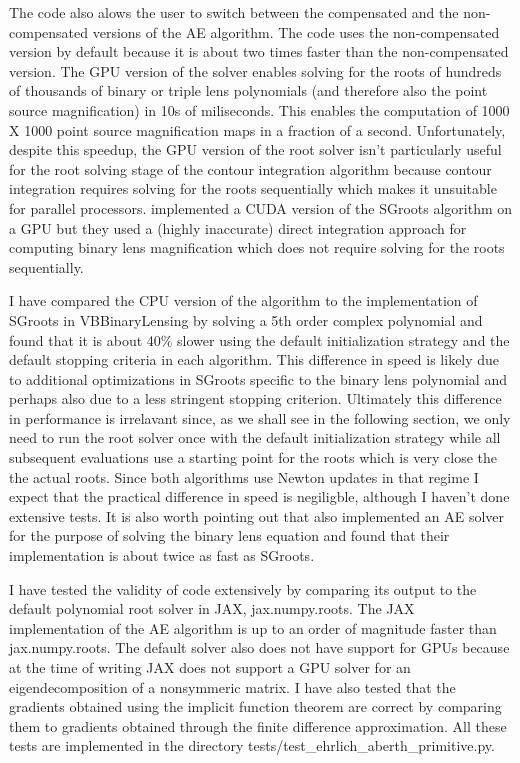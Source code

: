 \documentclass[12pt,dvipsnames]{report}
\newcommand{\ssf}[1]{\textsf{#1}}
\begin{document}
The code also alows the user to switch between the compensated  and the non-compensated 
versions of the AE algorithm. The code uses the non-compensated version by default because 
it is about two times faster than the non-compensated version. The GPU version of the 
solver enables solving for the roots of hundreds of thousands of binary or triple lens 
polynomials (and therefore also the point source magnification) in 10s of miliseconds.  
This enables the computation of 1000 X 1000 point source magnification maps 
in a fraction of a second. Unfortunately, despite this speedup, the GPU version of the 
root solver isn't particularly useful for the root solving stage of the contour integration 
algorithm because  contour integration requires solving for the roots sequentially 
which makes it unsuitable for parallel processors.
\citet{mcdougall2014} implemented a \ssf{CUDA} version of the \ssf{SGroots} algorithm 
on a GPU but they used  a (highly inaccurate) direct integration approach for 
computing binary lens magnification which does not require solving for the roots 
sequentially. 

I have compared the CPU version of the algorithm to the implementation of \ssf{SGroots} 
in \ssf{VBBinaryLensing} by solving a 5th order complex polynomial and found that 
it is about 40\% slower using the default initialization strategy and the default 
stopping criteria in each algorithm. This difference in speed is likely due to additional 
optimizations in \ssf{SGroots} specific to the binary lens polynomial and perhaps also due 
to  a less stringent stopping criterion. Ultimately this difference in performance is 
irrelavant since, as we shall see in the following section, we only need to run the 
root solver once  with the default initialization strategy while all subsequent evaluations 
use a starting  point for the roots which is very close the the actual roots. 
Since both algorithms use Newton updates in that regime I expect that the practical 
difference in speed is negiligble, although I haven't done extensive tests. It is also 
worth pointing out that \citet{2022MNRAS.514.4379F} also implemented an AE solver for 
the purpose of solving the binary lens equation and found that their implementation 
is about twice as fast as \ssf{SGroots}. 

I have tested the validity of code extensively by comparing its output to the 
default polynomial root solver in \ssf{JAX}, \ssf{jax.numpy.roots}. The \ssf{JAX} 
implementation of the AE algorithm is up to an order of magnitude faster than 
\ssf{jax.numpy.roots}. The default solver also does not have support for GPUs because 
at the time of writing \ssf{JAX} does not support a GPU solver for an eigendecomposition 
of a nonsymmeric matrix.
I have also tested that the gradients obtained using the implicit function theorem are 
correct by comparing them to gradients obtained through the finite 
difference approximation. All these tests are implemented in the directory
\ssf{tests/test\_ehrlich\_aberth\_primitive.py}.
\end{document}
